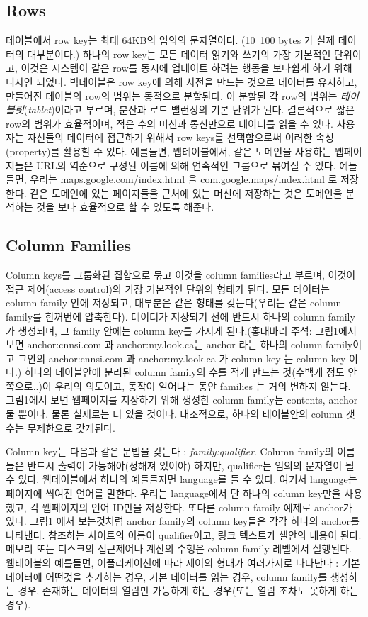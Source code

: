 \documentclass[twocolumn]{article}
\begin{document}
\subsection*{Rows}
 테이블에서 row key는 최대 64KB의 임의의 문자열이다. (10~100 bytes 가 실제 데이터의 대부분이다.)
하나의 row key는 모든 데이터 읽기와 쓰기의 가장 기본적인 단위이고, 이것은 시스템이 같은 row를 동시에 업데이트 하려는 행동을 보다쉽게 하기 위해 디자인 되었다.
 빅테이블은 row key에 의해 사전을 만드는 것으로 데이터를 유지하고, 만들어진 테이블의 row의 범위는 동적으로 분할된다. 이 분할된 각 row의 범위는 \textit{테이블릿}(\textit{tablet})이라고 부르며, 분산과 로드 밸런싱의 기본 단위가 된다. 결론적으로 짧은 row의 범위가 효율적이며, 적은 수의 머신과 통신만으로 데이터를 읽을 수 있다. 사용자는 자신들의 데이터에 접근하기 위해서 row keys를 선택함으로써 이러한 속성(property)를 활용할 수 있다.
예를들면, 웹테이블에서, 같은 도메인을 사용하는 웹페이지들은 URL의 역순으로 구성된 이름에 의해 연속적인 그룹으로 묶여질 수 있다. 예들들면, 우리는 maps.google.com/index.html 을 com.google.maps/index.html 로 저장한다. 같은 도메인에 있는 페이지들을 근처에 있는 머신에 저장하는 것은 도메인을 분석하는 것을 보다 효율적으로 할 수 있도록 해준다.
 
\subsection*{Column Families}
 Column keys를 그룹화된 집합으로 묶고 이것을 column families라고 부르며, 이것이 접근 제어(access control)의 가장 기본적인 단위의 형태가 된다. 모든 데이터는 column family 안에 저장되고, 대부분은 같은 형태를 갖는다(우리는 같은 column family를 한꺼번에 압축한다). 데이터가 저장되기 전에 반드시 하나의 column family가 생성되며, 그 family 안에는 column key를 가지게 된다.(홍태바리 주석: 그림1에서 보면 anchor:cnnsi.com 과 anchor:my.look.ca는 anchor 라는 하나의 column family이고 그안의 anchor:cnnsi.com 과 anchor:my.look.ca 가 column key 는 column key 이다.)
하나의 테이블안에 분리된 column family의 수를 적게 만드는 것(수백개 정도 안쪽으로..)이 우리의 의도이고, 동작이 일어나는 동안 families 는 거의 변하지 않는다. 그림1에서 보면 웹페이지를 저장하기 위해 생성한 column family는 contents, anchor 둘 뿐이다. 물론 실제로는 더 있을 것이다. 대조적으로, 하나의 테이블안의 column 갯수는 무제한으로 갖게된다.

Column key는 다음과 같은 문법을 갖는다 :
\textit{ family:qualifier}. Column family의 이름들은 반드시 출력이 가능해야(정해져 있어야) 하지만, qualifier는 임의의 문자열이 될 수 있다. 웹테이블에서 하나의 예들들자면 language를 들 수 있다. 여기서 language는 페이지에 씌여진 언어를 말한다. 우리는 language에서 단 하나의 column key만을 사용했고, 각 웹페이지의 언어 ID만을 저장한다. 또다른 column family 예제로 anchor가 있다. 그림1 에서 보는것처럼 anchor family의 column key들은 각각 하나의 anchor를 나타낸다. 참조하는 사이트의 이름이 qualifier이고, 링크 텍스트가 셀안의 내용이 된다.
 메모리 또는 디스크의 접근제어나 계산의 수행은 column family 레벨에서 실행된다. 웹테이블의 예를들면, 어플리케이션에 따라 제어의 형태가 여러가지로 나타난다 : 기본 데이터에 어떤것을 추가하는 경우, 기본 데이터를 읽는 경우, column family를 생성하는 경우, 존재하는 데이터의 열람만 가능하게 하는 경우(또는 열람 조차도 못하게 하는 경우).
 
\end{document}
